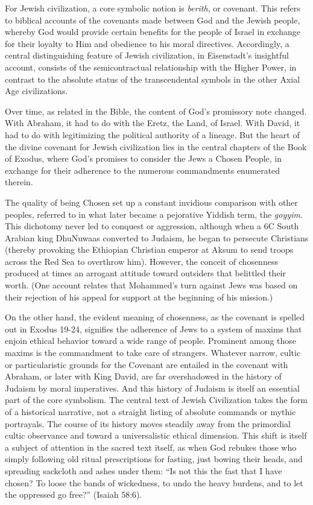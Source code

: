 For Jewish civilization, a core symbolic notion is \emph{berith}, or covenant. This refers to biblical accounts of the covenants made between God and the Jewish people, whereby God would provide certain benefits for the people of Israel in exchange for their loyalty to Him and obedience to his moral directives. Accordingly, a central distinguishing feature of Jewish civilization, in Eisenstadt's insightful account, consists of the semicontractual relationship with the Higher Power, in contrast to the absolute status of the transcendental symbols in the other Axial Age civilizations. 

Over time, as related in the Bible, the content of God's promissory note changed. With Abraham, it had to do with the Eretz, the Land, of Israel. With David, it had to do with legitimizing the political authority of a lineage. But the heart of the divine covenant for Jewish civilization lies in the central chapters of the Book of Exodus, where God's promises to consider the Jews a Chosen People, in exchange for their adherence to the numerous commandments enumerated therein. 

The quality of being Chosen set up a constant invidious comparison with other peoples, referred to in what later became a pejorative Yiddish term, the \emph{goyyim}. This dichotomy never led to conquest or aggression, although when a 6C South Arabian king DhuNuwaas converted to Judaism, he began to persecute Christians (thereby provoking the Ethiopian Christian emperor at Aksum to send troops across the Red Sea to overthrow him). However, the conceit of chosenness produced at times an arrogant attitude toward outsiders that belittled their worth. (One account relates that Mohammed's turn against Jews was based on their rejection of his appeal for support at the beginning of his mission.)

On the other hand, the evident meaning of chosenness, as the covenant is spelled out in Exodus 19-24, signifies the adherence of Jews to a system of maxims that enjoin ethical behavior toward a wide range of people. Prominent among those maxims is the commandment to take care of strangers. Whatever narrow, cultic or particularistic grounds for the Covenant are entailed in the covenant with Abraham, or later with King David, are far overshadowed in the history of Judaism by moral imperatives. And this history of Judaism is itself an essential part of the core symbolism. The central text of Jewish Civilization takes the form of a historical narrative, not a straight listing of absolute commands or mythic portrayals. The course of its history moves steadily away from the primordial cultic observance and toward a universalistic ethical dimension. This shift is itself a subject of attention in the sacred text itself, as when God rebukes those who simply following old ritual prescriptions for fasting, just bowing their heads, and spreading sackcloth and ashes under them: ``Is not this the fast that I have chosen? To loose the bands of wickedness, to undo the heavy burdens, and to let the oppressed go free?'' (Isaiah 58:6).

